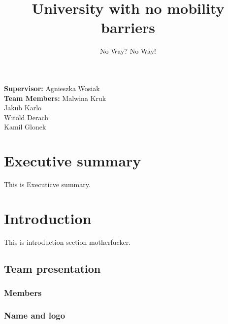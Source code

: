 \documentclass[12pt,letterpaper]{article}
\begin{document}
\title{University with no mobility barriers}
\author{No Way? No Way!}
\maketitle

\begin{flushright}
\vspace*{\fill}
\textbf{Supervisor:} Agnieszka Wosiak\\
\textbf{Team Members:} Malwina Kruk\\ Jakub Karlo\\ Witold Derach\\ Kamil Glonek
\end{flushright}

\newpage

\renewcommand*\contentsname{Table of contents}
\tableofcontents

\newpage


\section{Executive summary}
This is Executicve summary.

\section{Introduction}
This is introduction section motherfucker.

\subsection{Team presentation}

\subsubsection{Members}

\subsubsection{Name and logo}
\end{document}
